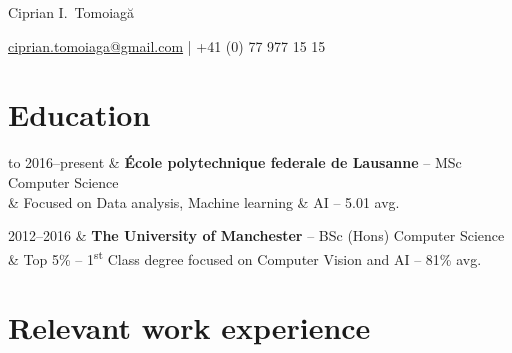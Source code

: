 \documentclass[11pt,a4paper]{article}
\begin{document}
  \noindent
  \begin{center} %
    {\LARGE Ciprian I.~Tomoiagă}
    \vspace*{-0.5em}

    \href{mailto:ciprian.tomoiaga@gmail.com}{\textsf{ciprian.tomoiaga@gmail.com}}
    | \textsf{+41 (0) 77 977 15 15}
  \vspace*{-2ex}
\end{center}

\section*{Education}
  \begin{tabu} to 
    2016--present
      & \textbf{École polytechnique federale de Lausanne} -- MSc Computer Science\\
      & Focused on Data analysis, Machine learning \& AI -- 5.01 avg.\\
  \end{tabu}

  \begin{tabu}{}
    2012--2016
      & \textbf{The University of Manchester} -- BSc (Hons) Computer Science\\
      & Top 5\% -- 1\textsuperscript{st} Class degree focused on Computer Vision and AI -- 81\% avg.
  \end{tabu}


\section*{Relevant work experience}
\end{document}

